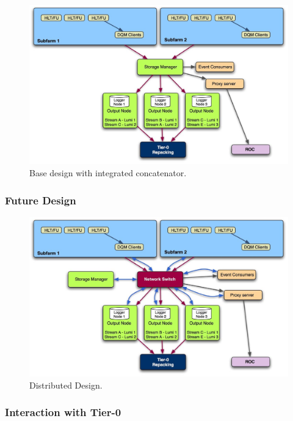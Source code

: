 \begin{figure}[hbtp]
  \begin{center}
    \includegraphics[width=5.5in]{SM_architecture_opt1.eps}
    \caption{Base design with integrated concatenator.}
    \label{fig:opt1_design}
  \end{center}
\end{figure}


\subsubsection{Future Design}

\begin{figure}[hbtp]
  \begin{center}
    \includegraphics[width=5.5in]{SM_architecture_opt2.eps}
    \caption{Distributed Design.}
    \label{fig:opt2_design}
  \end{center}
\end{figure}

\subsubsection{Interaction with Tier-0}

